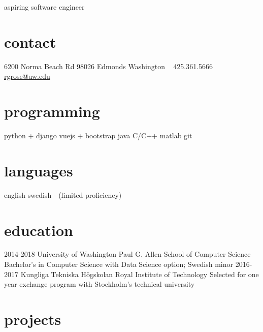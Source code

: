 \documentclass[]{friggeri-cv}
\begin{document}
       {aspiring software engineer}


\begin{aside}
  \section{contact}
    6200 Norma Beach Rd
    98026 Edmonds
    Washington
    ~
    425.361.5666
    \href{mailto:rgrose@uw.edu}{rgrose@uw.edu}
    \href{https://www.linkedin.com/in/ryanwgrose}{\faLinkedin}
  \section{programming}
    python + django
    vuejs + bootstrap
    java
    C/C++
    matlab
    git
  \section{languages}
    english
    swedish -
    (limited proficiency)
\end{aside}



\section{education}

\begin{entrylist}
  \entry
    {2014-2018}
    {University of Washington}
    {Paul G. Allen School of Computer Science}
    {Bachelor's in Computer Science with Data Science option; Swedish minor}
  \entry
    {2016-2017}
    {Kungliga Tekniska Högskolan}
    {Royal Institute of Technology }
    {Selected for one year exchange program with Stockholm's technical university}
\end{entrylist}

\section{projects}
\end{document}

